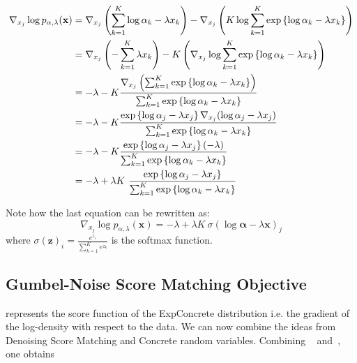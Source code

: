 \begin{align}
    \nabla_{x_j} \log p_{\alpha, \lambda}(\mathbf{x}) &= 
    \nabla_{x_j} \left( { \sum_{k=1}^{K} \log \alpha_k - \lambda x_k } \right) -
    \nabla_{x_j} \left( {K\log \sum_{k=1}^{K} \exp \left\{ {\log \alpha_k - \lambda x_k} \right\} } \right) \\
    &= \nabla_{x_j} \left( { - \sum_{k=1}^{K} \lambda x_k } \right) -
   K \left( { \nabla_{x_j} \log \sum_{k=1}^{K} \exp \left\{ {\log \alpha_k - \lambda x_k} \right\}} \right) \\
    &= - \lambda -K\frac{\nabla_{x_j} \left( {\sum_{k=1}^{K} \exp \left\{ {\log \alpha_k - \lambda x_k} \right\}} \right)}{ \sum_{k=1}^{K} \exp \left\{ {\log \alpha_k - \lambda x_k} \right\}} \\
    &= - \lambda -K\frac{\exp \left\{ {\log \alpha_j - \lambda x_j} \right\} \nabla_{x_j} (\log \alpha_j - \lambda x_j)}{ \sum_{k=1}^{K} \exp \left\{ {\log \alpha_k - \lambda x_k} \right\}} \\
    &= - \lambda -K\frac{\exp \left\{ {\log \alpha_j - \lambda x_j} \right\} (- \lambda) }{ \sum_{k=1}^{K} \exp \left\{ {\log \alpha_k - \lambda x_k} \right\}} \\
    &= - \lambda + \lambda K~\frac{\exp \left\{ {\log \alpha_j - \lambda x_j} \right\}}{ \sum_{k=1}^{K} \exp \left\{ {\log \alpha_k - \lambda x_k} \right\}}
\end{align}

Note how the last equation can be rewritten as:
\begin{equation}
\label{eq:concrete_score}
     \nabla_{x_j} \log p_{\alpha, \lambda}(\mathbf{x}) = - \lambda + \lambda K~\sigma(\log \boldsymbol{\alpha} - \lambda \mathbf{x})_j
\end{equation}
where $\sigma(\mathbf{z})_i = \frac{e^{z_i}}{ \sum_{k=1}^{K} e^{z_k}}$ is the softmax function. 

\subsection*{Gumbel-Noise Score Matching Objective}
 represents the score function of the ExpConcrete distribution i.e. the gradient of the log-density with respect to the data. We can now combine the ideas from Denoising Score Matching and Concrete random variables.
Combining ~ and~, one obtains

